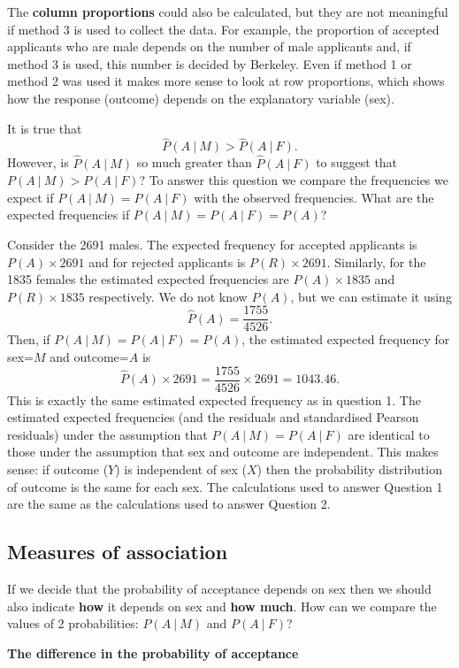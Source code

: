 \documentclass[
  british,
  11pt,
  openany, a4paper]{book}
\begin{document}
The \textbf{column proportions} could also be calculated, but they are not meaningful
if method 3 is used to collect the data. For example, the proportion of accepted applicants who are male depends on the number of male applicants and, if method 3 is used, this number is decided by Berkeley. Even if method 1 or method 2 was used it makes more sense to look at row proportions, which shows how the response (outcome) depends on the explanatory variable (sex).

It is true that
\[ \hat{P}(A~|~M) > \hat{P}(A~|~F). \]
However, is \(\hat{P}(A~|~M)\) so much greater than \(\hat{P}(A~|~F)\) to suggest that \(P(A~|~M) > P(A~|~F)\)? To answer this question we compare the frequencies we expect if \(P(A~|~M) = P(A~|~F)\) with the observed frequencies. What are the expected frequencies if \(P(A~|~M)=P(A~|~F)=P(A)\)?

Consider the 2691 males. The expected frequency for accepted applicants is \(P(A) \times 2691\) and for rejected applicants is \(P(R) \times 2691\). Similarly, for the 1835 females the estimated expected frequencies are \(P(A) \times 1835\) and \(P(R) \times 1835\) respectively. We do not know \(P(A)\), but we can estimate it using
\[ \hat{P}(A) = \frac{1755}{4526}. \]
Then, if \(P(A~|~M)=P(A~|~F)=P(A)\), the estimated expected frequency for sex=\(M\) and outcome=\(A\) is
\[ \hat{P}(A) \times 2691 = \frac{1755}{4526} \times 2691 = 1043.46. \]
This is exactly the same estimated expected frequency as in question 1. The estimated expected frequencies (and the residuals and standardised Pearson residuals) under the assumption that \(P(A~|~M)=P(A~|~F)\) are identical to those under the assumption that sex and outcome are independent. This makes sense: if outcome (\(Y\)) is independent of sex (\(X\)) then the probability distribution of outcome is the same for each sex. The calculations used to answer Question 1 are the same as the calculations used to answer Question 2.

\subsection{Measures of association}\label{measures}

If we decide that the probability of acceptance depends on sex then we should also indicate \textbf{how} it depends on sex and \textbf{how much}. How can we compare the values of 2 probabilities: \(P(A~|~M)\) and \(P(A~|~F)\)?

\textbf{The difference in the probability of acceptance}
\end{document}
